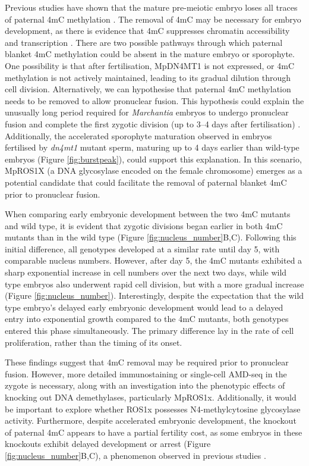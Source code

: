  Previous studies have shown that the mature pre-meiotic embryo loses all traces of paternal 4mC methylation \cite{RN189}. The removal of 4mC may be necessary for embryo development, as there is evidence that 4mC suppresses chromatin accessibility and transcription \cite{RN189}. There are two possible pathways through which paternal blanket 4mC methylation could be absent in the mature embryo or sporophyte.  One possibility is that after fertilisation, MpDN4MT1 is not expressed, or 4mC methylation is not actively maintained, leading to its gradual dilution through cell division. Alternatively, we can hypothesise that paternal 4mC methylation needs to be removed to allow pronuclear fusion. This hypothesis could explain the unusually long period required for \textit{Marchantia} embryos to undergo pronuclear fusion and complete the first zygotic division (up to 3–4 days after fertilisation) \cite{RN139}. Additionally, the accelerated sporophyte maturation observed in embryos fertilised by \textit{dn4mt1} mutant sperm, maturing up to 4 days earlier than wild-type embryos (Figure \ref{fig:burstpeak}), could support this explanation. In this scenario, MpROS1X (a DNA glycosylase encoded on the female chromosome) emerges as a potential candidate that could facilitate the removal of paternal blanket 4mC prior to pronuclear fusion.

When comparing early embryonic development between the two 4mC mutants and wild type, it is evident that zygotic divisions began earlier in both 4mC mutants than in the wild type (Figure \ref{fig:nucleus_number}B,C). Following this initial difference, all genotypes developed at a similar rate until day 5, with comparable nucleus numbers. However, after day 5, the 4mC mutants exhibited a sharp exponential increase in cell numbers over the next two days, while wild type embryos also underwent rapid cell division, but with a more gradual increase (Figure \ref{fig:nucleus_number}). Interestingly, despite the expectation that the wild type embryo's delayed early embryonic development would lead to a delayed entry into exponential growth compared to the 4mC mutants, both genotypes entered this phase simultaneously. The primary difference lay in the rate of cell proliferation, rather than the timing of its onset.

These findings suggest that 4mC removal may be required prior to pronuclear fusion. However, more detailed immunostaining or single-cell AMD-seq in the zygote is necessary, along with an investigation into the phenotypic effects of knocking out DNA demethylases, particularly MpROS1x. Additionally, it would be important to explore whether ROS1x possesses N4-methylcytosine glycosylase activity. Furthermore, despite accelerated embryonic development, the knockout of paternal 4mC appears to have a partial fertility cost, as some embryos in these knockouts exhibit delayed development or arrest (Figure \ref{fig:nucleus_number}B,C), a phenomenon observed in previous studies \cite{RN189}.

